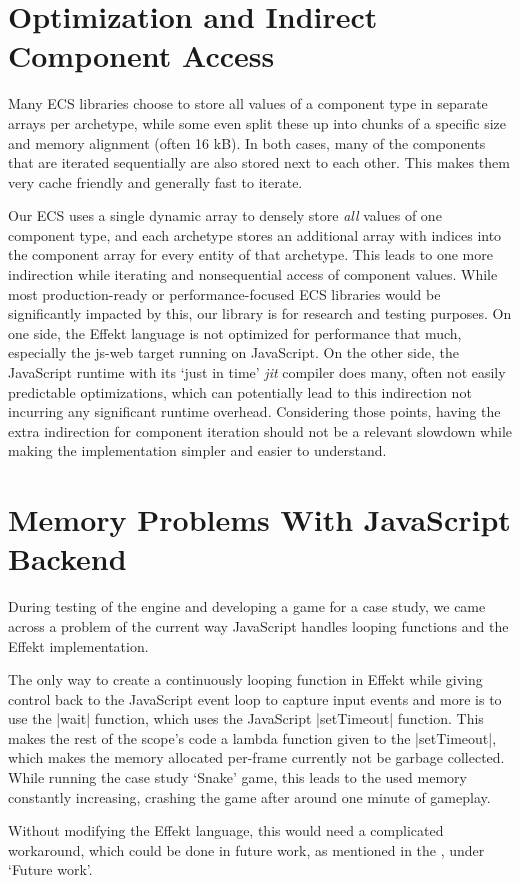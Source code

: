\section{Optimization and Indirect Component Access}\label{sec:indirectaccess}

Many ECS libraries choose to store all values of a component type in separate arrays per archetype, while some even split these up into chunks of a specific size and memory alignment (often 16 kB). In both cases, many of the components that are iterated sequentially are also stored next to each other. This makes them very cache friendly and generally fast to iterate.

Our ECS uses a single dynamic array to densely store \textit{all} values of one component type, and each archetype stores an additional array with indices into the component array for every entity of that archetype. This leads to one more indirection while iterating and nonsequential access of component values. While most production-ready or performance-focused ECS libraries would be significantly impacted by this, our library is for research and testing purposes. On one side, the Effekt language is not optimized for performance that much, especially the \textsf{js-web} target running on JavaScript. On the other side, the JavaScript runtime with its `just in time' \textit{jit} compiler does many, often not easily predictable optimizations, which can potentially lead to this indirection not incurring any significant runtime overhead. Considering those points, having the extra indirection for component iteration should not be a relevant slowdown while making the implementation simpler and easier to understand.

\section{Memory Problems With JavaScript Backend}\label{sec:memoryproblem}

During testing of the engine and developing a game for a case study, we came across a problem of the current way JavaScript handles looping functions and the Effekt implementation.

The only way to create a continuously looping function in Effekt while giving control back to the JavaScript event loop to capture input events and more is to use the |wait| function, which uses the JavaScript |setTimeout| function. This makes the rest of the scope's code a lambda function given to the |setTimeout|, which makes the memory allocated per-frame currently not be garbage collected. While running the case study `Snake' game, this leads to the used memory constantly increasing, crashing the game after around one minute of gameplay.

Without modifying the Effekt language, this would need a complicated workaround, which could be done in future work, as mentioned in the , under `Future work'.
